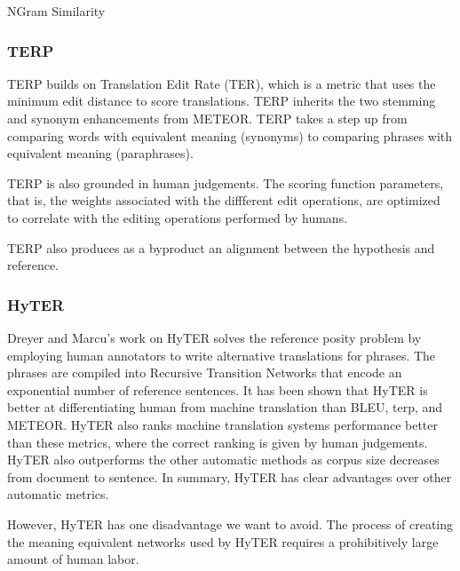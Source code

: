 \begin{block}{NGram Similarity}
\subsubsection{TERP}
\label{sec:terp}


TERP builds on Translation Edit Rate (TER), which is a metric that uses the minimum edit distance to score translations. 
TERP inherits the two stemming and synonym enhancements from METEOR. 
TERP takes a step up from comparing words with equivalent meaning    (synonyms) to comparing phrases with equivalent meaning (paraphrases). 

TERP is also grounded in human judgements. 
The scoring function parameters, that is, the weights associated with the diffferent edit operations, are optimized  to correlate with the  editing operations performed by humans. 

TERP also produces as a byproduct an alignment between the hypothesis and reference. 

\subsubsection{HyTER}
\label{sec:hyter}


Dreyer and Marcu's work  on HyTER  solves the reference posity problem by employing human annotators to write alternative translations for phrases. 
The phrases are compiled into Recursive Transition Networks that encode an exponential number of reference sentences. 
It has been shown that HyTER is better at differentiating human from machine translation than BLEU, terp, and METEOR. 
HyTER also ranks machine translation systems performance better than these metrics, where the correct ranking is given by human judgements. 
HyTER also outperforms the other automatic methods as corpus size decreases   from document to sentence. 
In summary, HyTER has clear advantages over other automatic metrics. 

However,   HyTER has one disadvantage we want to avoid. 
The process of creating the meaning equivalent networks used by HyTER requires a prohibitively large amount of human labor. 


\end{block}
